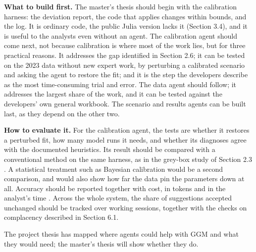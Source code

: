 \textbf{What to build first.} The master's thesis should begin with the calibration harness: the deviation report, the code that applies changes within bounds, and the log.
It is ordinary code, the public Julia version lacks it (Section 3.4), and it is useful to the analysts even without an agent.
The calibration agent should come next, not because calibration is where most of the work lies, but for three practical reasons.
It addresses the gap identified in Section 2.6; it can be tested on the 2023 data without new expert work, by perturbing a calibrated scenario and asking the agent to restore the fit; and it is the step the developers describe as the most time-consuming trial and error.
The data agent should follow; it addresses the largest share of the work, and it can be tested against the developers' own general workbook.
The scenario and results agents can be built last, as they depend on the other two.

\textbf{How to evaluate it.} For the calibration agent, the tests are whether it restores a perturbed fit, how many model runs it needs, and whether its diagnoses agree with the documented heuristics.
Its result should be compared with a conventional method on the same harness, as in the grey-box study of Section 2.3 \citep{gomezguillen2026agentic}.
A statistical treatment such as Bayesian calibration \citep{kennedy2001bayesian} would be a second comparison, and would also show how far the data pin the parameters down at all.
Accuracy should be reported together with cost, in tokens and in the analyst's time \citep{kapoor2024ai}.
Across the whole system, the share of suggestions accepted unchanged should be tracked over working sessions, together with the checks on complacency described in Section 6.1.

The project thesis has mapped where agents could help with GGM and what they would need; the master's thesis will show whether they do.

